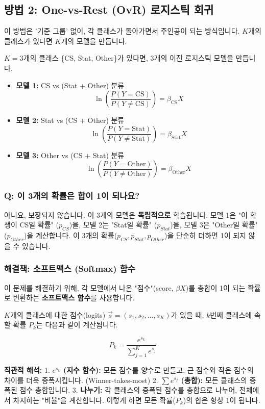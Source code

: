 \documentclass[11pt,a4paper]{book}
\theoremstyle{definition}
\begin{document}
\subsection{방법 2: One-vs-Rest (OvR) 로지스틱 회귀}

이 방법은 '기준 그룹' 없이, 각 클래스가 돌아가면서 주인공이 되는 방식입니다. $K$개의 클래스가 있다면 $K$개의 모델을 만듭니다.

\begin{examplebox}[title=비유: 학생 전공 예측 (OvR 방식)]
$K=3$개의 클래스 \{CS, Stat, Other\}가 있다면, 3개의 이진 로지스틱 모델을 만듭니다.

\begin{itemize}
    \item \textbf{모델 1:} CS vs (Stat + Other) 분류
    $$ \ln\left(\frac{P(Y=\text{CS})}{P(Y \neq \text{CS})}\right) = \beta_{\text{CS}} X $$
    
    \item \textbf{모델 2:} Stat vs (CS + Other) 분류
    $$ \ln\left(\frac{P(Y=\text{Stat})}{P(Y \neq \text{Stat})}\right) = \beta_{\text{Stat}} X $$
    
    \item \textbf{모델 3:} Other vs (CS + Stat) 분류
    $$ \ln\left(\frac{P(Y=\text{Other})}{P(Y \neq \text{Other})}\right) = \beta_{\text{Other}} X $$
\end{itemize}
\end{examplebox}

\subsubsection{Q: 이 3개의 확률은 합이 1이 되나요?}

아니요, 보장되지 않습니다. 이 3개의 모델은 \textbf{독립적으로} 학습됩니다.
모델 1은 "이 학생이 CS일 확률" ($p_{CS}$)을, 모델 2는 "Stat일 확률" ($p_{Stat}$)을, 모델 3은 "Other일 확률" ($p_{Other}$)을 계산합니다.
이 3개의 확률($p_{CS}, p_{Stat}, p_{Other}$)을 단순히 더하면 1이 되지 않을 수 있습니다.

\subsubsection{해결책: 소프트맥스 (Softmax) 함수}

이 문제를 해결하기 위해, 각 모델에서 나온 "점수"(score, $\beta X$)를 총합이 1이 되는 확률로 변환하는 \textbf{소프트맥스 함수}를 사용합니다.

\begin{defbox}[title=소프트맥스 함수 (Softmax Function)]
$K$개의 클래스에 대한 점수(logits) $\vec{s} = (s_1, s_2, \dots, s_K)$가 있을 때, $k$번째 클래스에 속할 확률 $P_k$는 다음과 같이 계산됩니다.

$$ P_k = \frac{e^{s_k}}{\sum_{j=1}^{K} e^{s_j}} $$

\textbf{직관적 해석:}
1. \textbf{$e^{s_k}$ (지수 함수):} 모든 점수를 양수로 만들고, 큰 점수와 작은 점수의 차이를 더욱 증폭시킵니다. (Winner-takes-most)
2. \textbf{$\sum e^{s_j}$ (총합):} 모든 클래스의 증폭된 점수 총합입니다.
3. \textbf{나누기:} 각 클래스의 증폭된 점수를 총합으로 나누어, 전체에서 차지하는 "비율"을 계산합니다. 이렇게 하면 모든 확률($P_k$)의 합은 항상 1이 됩니다.
\end{defbox}
\end{document}
